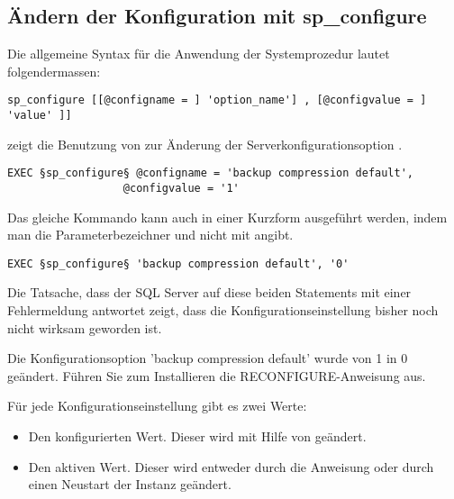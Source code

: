       \subsection{Ändern der Konfiguration mit sp\_configure}
        Die allgemeine Syntax für die Anwendung der Systemprozedur
         lautet folgendermassen:
        \begin{lstlisting}[language=ms_sql,caption={Die Syntax von
sp\_configure},label=admin03_01]
sp_configure [[@configname = ] 'option_name'] , [@configvalue = ] 'value' ]]
          \end{lstlisting}
         zeigt die Benutzung von
         zur Änderung der
        Serverkonfigurationsoption .
        \begin{lstlisting}[language=ms_sql,caption={Ein erstes Beispiel zur
          Nutzung von sp\_configure},label=admin03_02]
EXEC §sp_configure§ @configname = 'backup compression default', 
                  @configvalue = '1'
          \end{lstlisting}
        Das gleiche Kommando kann auch in einer Kurzform ausgeführt werden,
        indem man die Parameterbezeichner  und
         nicht mit angibt.
        \begin{lstlisting}[language=ms_sql,caption={Die Kurzform der Syntax
          für sp\_configure},label=admin03_03]
EXEC §sp_configure§ 'backup compression default', '0'
          \end{lstlisting}
        Die Tatsache, dass der SQL Server auf diese beiden Statements mit einer
        Fehlermeldung antwortet zeigt, dass die Konfigurationseinstellung
        bisher noch nicht wirksam geworden ist.
        \begin{small}
          \begin{mssql}
Die Konfigurationsoption 'backup compression default' wurde von 1 in 0 geändert.
Führen Sie zum Installieren die RECONFIGURE-Anweisung aus.
            \end{mssql}
        \end{small}
        Für jede Konfigurationseinstellung gibt es zwei Werte:
        \begin{itemize}
            \item Den konfigurierten Wert. Dieser wird mit Hilfe von
             geändert.
            \item Den aktiven Wert. Dieser wird entweder durch die Anweisung
             oder durch einen Neustart der Instanz
            geändert.
        \end{itemize}
